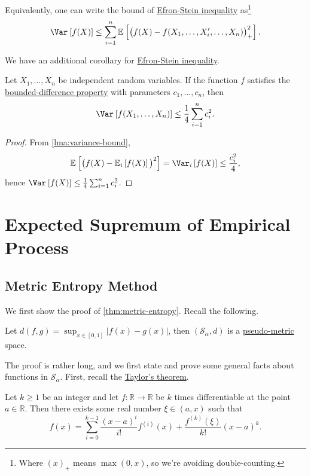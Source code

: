 \begin{remark}
	Equivalently, one can write the bound of \hyperref[thm:Efron-Stein-inequality]{Efron-Stein inequality} as\footnote{Where \((x)_+\) means \(\max (0, x)\), so we're avoiding double-counting.}
	\[
		\Var_{}\left[f(X) \right]
		\leq \sum_{i=1}^{n} \mathbb{E}_{}\left[\big( f(X) - f(X_1, \dots , X_i^{\prime} , \dots , X_n) \big)_+^2 \right].
	\]
\end{remark}

We have an additional corollary for \hyperref[thm:Efron-Stein-inequality]{Efron-Stein inequality}.

\begin{corollary}
	Let \(X_1, \dots , X_n\) be independent random variables. If the function \(f\) satisfies the \hyperref[def:bounded-difference-property]{bounded-difference property} with parameters \(c_1, \dots , c_n\), then
	\[
		\Var_{}\left[f(X_1, \dots , X_n) \right] \leq \frac{1}{4} \sum_{i=1}^{n} c_i^2.
	\]
\end{corollary}
\begin{proof}
	From \autoref{lma:variance-bound},
	\[
		\mathbb{E}_{}\left[\big(f(X) - \mathbb{E}_{i}\left[f(X) \right] \big)^2\right]
		= \Var_{i}\left[f(X) \right]
		\leq \frac{c_i^2}{4},
	\]
	hence \(\Var_{}\left[f(X) \right] \leq \frac{1}{4}\sum_{i=1}^{n} c_i^2\).
\end{proof}

\section{Expected Supremum of Empirical Process}
\subsection{Metric Entropy Method}
We first show the proof of \autoref{thm:metric-entropy}. Recall the following.

\begin{prev}
	Let \(d(f, g) = \sup _{x\in [0, 1]} \vert f(x) - g(x) \vert \), then \((\mathcal{S} _\alpha , d)\) is a \hyperref[def:pseudo-metric]{pseudo-metric} space.
\end{prev}

The proof is rather long, and we first state and prove some general facts about functions in \(\mathcal{S} _\alpha \). First, recall the \hyperref[thm:Taylor]{Taylor's theorem}.
\begin{theorem}\label{thm:Taylor}
	Let \(k \geq 1\) be an integer and let \(f\colon \mathbb{R} \to \mathbb{R} \) be \(k\) times differentiable at the point \(a\in \mathbb{R} \). Then there exists some real number \(\xi \in (a, x)\) such that
	\[
		f(x) = \sum_{i=0}^{k-1} \frac{(x-a)^i}{i!} f^{(i)}(x) + \frac{f^{(k)}(\xi )}{k!} (x-a)^k.
	\]
\end{theorem}

